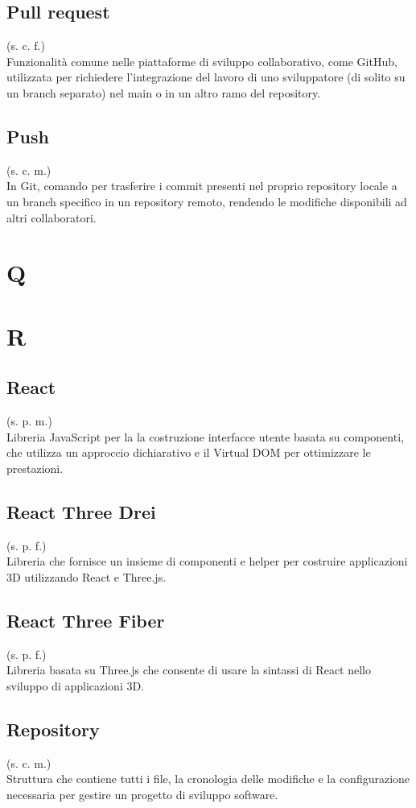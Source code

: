     \subsection{Pull request}
    (s. c. f.)\\
    Funzionalità comune nelle piattaforme di sviluppo collaborativo, come GitHub, utilizzata per 
    richiedere l'integrazione del lavoro di uno sviluppatore (di solito su un branch separato) 
    nel main o in un altro ramo del repository.
    \subsection{Push}
    (s. c. m.)\\
    In Git, comando per trasferire i commit presenti nel proprio repository locale a un 
    branch specifico in un repository remoto, rendendo le modifiche disponibili 
    ad altri collaboratori.

\pagebreak
\section{Q}
\pagebreak
\section{R}
    \subsection{React}
    (s. p. m.)\\
    Libreria JavaScript per la la costruzione interfacce utente basata su componenti, che utilizza un 
    approccio dichiarativo e il Virtual DOM per ottimizzare le prestazioni.
    \subsection{React Three Drei}
    \label{React Three Drei}
    (s. p. f.)\\
    Libreria che fornisce un insieme di componenti e helper per 
    costruire applicazioni 3D utilizzando React e Three.js.
    \subsection{React Three Fiber}
    \label{React Three Fiber}
    (s. p. f.)\\
    Libreria basata su Three.js che consente di usare la sintassi
    di React nello sviluppo di applicazioni 3D.
    \subsection{Repository}
    \label{Repository}
    (s. c. m.)\\
    Struttura che contiene tutti i file, la cronologia delle modifiche e la 
    configurazione necessaria per gestire un progetto di sviluppo software.
